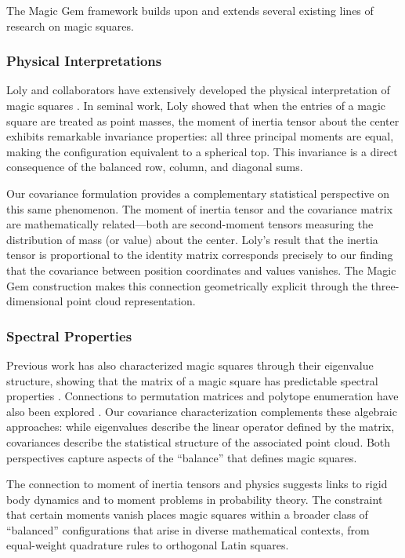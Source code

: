 The Magic Gem framework builds upon and extends several existing lines of research on magic squares.

\subsubsection{Physical Interpretations}

Loly and collaborators have extensively developed the physical interpretation of magic squares
\cite{loly2004invariance, loly2007franklin, loly2009spectra}.
In seminal work, Loly \cite{loly2004invariance} showed that when the entries of a magic square 
are treated as point masses, the moment of inertia tensor about the center exhibits remarkable 
invariance properties: all three principal moments are equal, making the configuration equivalent 
to a spherical top.
This invariance is a direct consequence of the balanced row, column, and diagonal sums.

Our covariance formulation provides a complementary statistical perspective on this same phenomenon.
The moment of inertia tensor and the covariance matrix are mathematically related---both are 
second-moment tensors measuring the distribution of mass (or value) about the center.
Loly's result that the inertia tensor is proportional to the identity matrix corresponds precisely 
to our finding that the covariance between position coordinates and values vanishes.
The Magic Gem construction makes this connection geometrically explicit through the three-dimensional 
point cloud representation.

\subsubsection{Spectral Properties}

Previous work has also characterized magic squares through their eigenvalue structure,
showing that the matrix of a magic square has predictable spectral properties
\cite{loly2009spectra, nordgren2012properties, nordgren2014spectra}.
Connections to permutation matrices and polytope enumeration have also been explored \cite{beck2006insideout, ahmed2003polyhedral}.
Our covariance characterization complements these algebraic approaches: 
while eigenvalues describe the linear operator defined by the matrix,
covariances describe the statistical structure of the associated point cloud.
Both perspectives capture aspects of the ``balance'' that defines magic squares.

The connection to moment of inertia tensors and physics suggests links to rigid body dynamics
and to moment problems in probability theory.
The constraint that certain moments vanish places magic squares within a broader class
of ``balanced'' configurations that arise in diverse mathematical contexts,
from equal-weight quadrature rules to orthogonal Latin squares.

